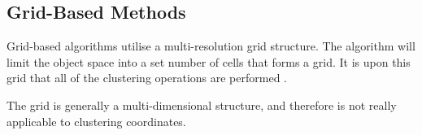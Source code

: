 \subsection{Grid-Based Methods}
Grid-based algorithms utilise a multi-resolution grid structure. The algorithm 
will limit the object space into a set number of cells that forms a grid. It is 
upon this grid that all of the clustering operations are performed 
\citep{han06}.

The grid is generally a multi-dimensional structure, and therefore is not 
really applicable to clustering coordinates.